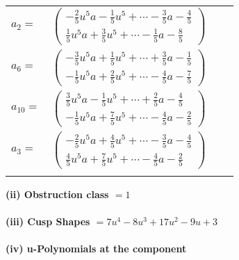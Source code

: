 \documentclass[1p]{elsarticle_modified}
\theoremstyle{definition}
\begin{document}
\begin{tabular}{m{7pt} m{180pt} m{7pt} m{180pt} }
\flushright $a_{2}=$&$\begin{pmatrix}-\frac{2}{5} u^5 a-\frac{1}{5} u^5+\cdots-\frac{3}{5} a-\frac{4}{5}\\\frac{1}{5} u^5 a+\frac{3}{5} u^5+\cdots-\frac{1}{5} a-\frac{8}{5}\end{pmatrix}$ \\
\flushright $a_{6}=$&$\begin{pmatrix}-\frac{3}{5} u^5 a+\frac{1}{5} u^5+\cdots+\frac{3}{5} a-\frac{1}{5}\\-\frac{1}{5} u^5 a+\frac{2}{5} u^5+\cdots-\frac{4}{5} a-\frac{7}{5}\end{pmatrix}$ \\
\flushright $a_{10}=$&$\begin{pmatrix}\frac{3}{5} u^5 a-\frac{1}{5} u^5+\cdots+\frac{2}{5} a-\frac{4}{5}\\-\frac{1}{5} u^5 a+\frac{7}{5} u^5+\cdots-\frac{4}{5} a-\frac{2}{5}\end{pmatrix}$ \\
\flushright $a_{3}=$&$\begin{pmatrix}-\frac{2}{5} u^5 a+\frac{4}{5} u^5+\cdots-\frac{3}{5} a-\frac{4}{5}\\\frac{4}{5} u^5 a+\frac{7}{5} u^5+\cdots-\frac{4}{5} a-\frac{2}{5}\end{pmatrix}$\\&\end{tabular}
\flushleft \textbf{(ii) Obstruction class $= 1$}\\~\\
\flushleft \textbf{(iii) Cusp Shapes $= 7 u^4-8 u^3+17 u^2-9 u+3$}\\~\\
\newpage\renewcommand{\arraystretch}{1}
\flushleft \textbf{(iv) u-Polynomials at the component}\newline \\
\end{document}
